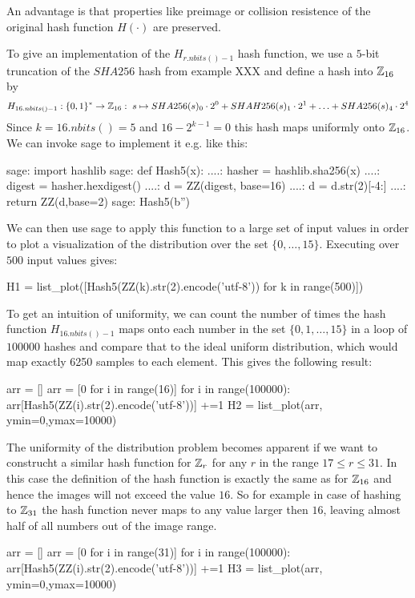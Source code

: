 An advantage is that properties like preimage or collision resistence of the original hash function $H(\cdot)$ are preserved.
\begin{example} To give an implementation of the $H_{r.nbits()-1}$ hash function, we use a $5$-bit truncation of the $SHA256$ hash from example XXX and define a hash into $\mathbb{Z}_{16}$ by
$$
H_{16.nbits()-1}: \{0,1\}^* \to \mathbb{Z}_{16}:\; s\mapsto
SHA256(s)_0\cdot 2^0 + SHAH256(s)_1\cdot 2^1 + \ldots + SHA256(s)_4\cdot 2^4 
$$
Since $k=16.nbits()=5$ and $16-2^{k-1}=0$ this hash maps uniformly onto $\mathbb{Z}_{16}$. We can invoke sage to implement it e.g. like this:
\begin{sagecommandline}
sage: import hashlib 
sage: def Hash5(x):
....:     hasher = hashlib.sha256(x)
....:     digest = hasher.hexdigest()
....:     d = ZZ(digest, base=16)
....:     d = d.str(2)[-4:]
....:     return ZZ(d,base=2)
sage: Hash5(b'')
\end{sagecommandline}
We can then use sage to apply this function to a large set of input values in order to plot a visualization of the distribution over the set $\{0,\ldots,15\}$. Executing over $500$ input values gives:
\begin{sagesilent}
H1 = list_plot([Hash5(ZZ(k).str(2).encode('utf-8')) for k in range(500)])
\end{sagesilent}
\begin{center} 
\end{center}
To get an intuition of uniformity, we can count the number of times the hash function $H_{16.nbits()-1}$ maps onto each number in the set $\{0,1,\ldots,15\}$ in a loop of $100000$ hashes and compare that to the ideal uniform distribution, which would map exactly 6250 samples to each element. This gives the following result:
\begin{sagesilent}
arr = []
arr = [0 for i in range(16)]
for i in range(100000):
    arr[Hash5(ZZ(i).str(2).encode('utf-8'))] +=1
H2 = list_plot(arr, ymin=0,ymax=10000)
\end{sagesilent}
\begin{center} 
\end{center}
The uniformity of the distribution problem becomes apparent if we want to construcht a similar hash function for $\mathbb{Z}_r$ for any $r$ in the range $17\leq r \leq 31$. In this case the definition of the hash function is exactly the same as for $\mathbb{Z}_{16}$ and hence the images will not exceed the value $16$. So for example in case of hashing to $\mathbb{Z}_{31}$ the hash function never maps to any value larger then $16$, leaving almost half of all numbers out of the image range.
\begin{sagesilent}
arr = []
arr = [0 for i in range(31)]
for i in range(100000):
    arr[Hash5(ZZ(i).str(2).encode('utf-8'))] +=1
H3 = list_plot(arr, ymin=0,ymax=10000)
\end{sagesilent}
\begin{center} 
\end{center}
\end{example}
 
